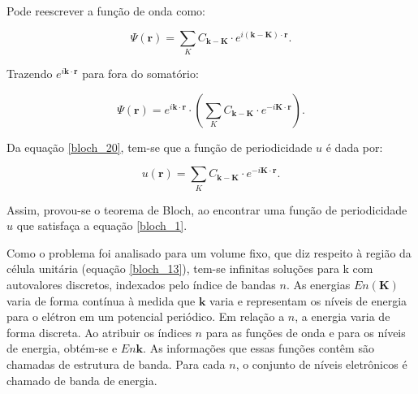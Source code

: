 	\par Pode reescrever a função de onda como:

	\begin{equation}
		\label{bloch_19}
		\Psi (\mathbf{r}) = \sum_{K} C_{\mathbf{k-K}}\cdot e^{i\mathbf{(k-K)}\cdot\mathbf{r}}.
	\end{equation}

	\par Trazendo $e^{i\mathbf{k} \cdot \mathbf{r}}$ para fora do somatório:

	\begin{equation}
		\label{bloch_20}
		\Psi (\mathbf{r}) = e^{i\mathbf{k}\cdot\mathbf{r}} \cdot \left(\sum_{K} C_{\mathbf{k-K}}\cdot e^{-i \mathbf{K}\cdot\mathbf{r}}\right).
	\end{equation}

	\par Da equação \eqref{bloch_20}, tem-se que a função de periodicidade $u$ é dada por:

	\begin{equation}
		\label{bloch_21}
		u(\mathbf{r}) = \sum_{K} C_{\mathbf{k-K}}\cdot e^{-i \mathbf{K}\cdot\mathbf{r}}.
	\end{equation}

	\par Assim, provou-se o teorema de Bloch, ao encontrar uma função de periodicidade $u$ que satisfaça a equação \eqref{bloch_1}.

	\par Como o problema foi analisado para um volume fixo, que diz respeito à região da célula unitária (equação \eqref{bloch_13}), tem-se infinitas soluções para k  com autovalores discretos, indexados pelo índice de bandas $n$. As energias $En(\mathbf{K})$ varia de forma contínua à medida que $\mathbf{k}$ varia e representam os níveis de energia para o elétron em um potencial periódico. Em relação a $n$, a energia varia de forma discreta. Ao atribuir os índices $n$ para as funções de onda e para os níveis de energia, obtém-se e $E n\mathbf{k}$. As informações que essas funções contêm são chamadas de estrutura de banda. Para cada $n$, o conjunto de níveis eletrônicos é chamado de banda de energia\cite{qm_fis5}. 

